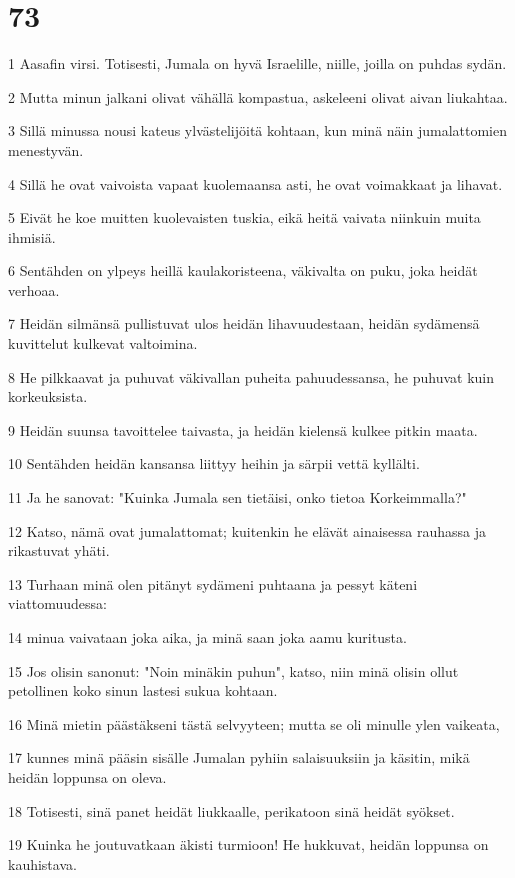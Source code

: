 \chapter{73}

\par 1 Aasafin virsi. Totisesti, Jumala on hyvä Israelille, niille, joilla on puhdas sydän.
\par 2 Mutta minun jalkani olivat vähällä kompastua, askeleeni olivat aivan liukahtaa.
\par 3 Sillä minussa nousi kateus ylvästelijöitä kohtaan, kun minä näin jumalattomien menestyvän.
\par 4 Sillä he ovat vaivoista vapaat kuolemaansa asti, he ovat voimakkaat ja lihavat.
\par 5 Eivät he koe muitten kuolevaisten tuskia, eikä heitä vaivata niinkuin muita ihmisiä.
\par 6 Sentähden on ylpeys heillä kaulakoristeena, väkivalta on puku, joka heidät verhoaa.
\par 7 Heidän silmänsä pullistuvat ulos heidän lihavuudestaan, heidän sydämensä kuvittelut kulkevat valtoimina.
\par 8 He pilkkaavat ja puhuvat väkivallan puheita pahuudessansa, he puhuvat kuin korkeuksista.
\par 9 Heidän suunsa tavoittelee taivasta, ja heidän kielensä kulkee pitkin maata.
\par 10 Sentähden heidän kansansa liittyy heihin ja särpii vettä kyllälti.
\par 11 Ja he sanovat: "Kuinka Jumala sen tietäisi, onko tietoa Korkeimmalla?"
\par 12 Katso, nämä ovat jumalattomat; kuitenkin he elävät ainaisessa rauhassa ja rikastuvat yhäti.
\par 13 Turhaan minä olen pitänyt sydämeni puhtaana ja pessyt käteni viattomuudessa:
\par 14 minua vaivataan joka aika, ja minä saan joka aamu kuritusta.
\par 15 Jos olisin sanonut: "Noin minäkin puhun", katso, niin minä olisin ollut petollinen koko sinun lastesi sukua kohtaan.
\par 16 Minä mietin päästäkseni tästä selvyyteen; mutta se oli minulle ylen vaikeata,
\par 17 kunnes minä pääsin sisälle Jumalan pyhiin salaisuuksiin ja käsitin, mikä heidän loppunsa on oleva.
\par 18 Totisesti, sinä panet heidät liukkaalle, perikatoon sinä heidät syökset.
\par 19 Kuinka he joutuvatkaan äkisti turmioon! He hukkuvat, heidän loppunsa on kauhistava.
